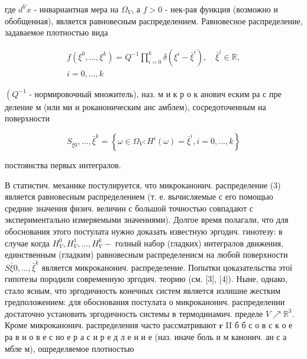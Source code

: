 \documentclass[10pt]{article}
\begin{document}
где $d^{V} x$ - инвариантная мера на $\Omega_{V}$, а $f>0$ - нек-рая функция (возможно и обобщенная), является равновесным распределением. Равновесное распределение, задаваемое плотностью вида



\[

\begin{gathered}

f\left(\xi^{0}, \ldots, \xi^{k}\right)=Q^{-1} \prod_{i=0}^{k} \delta\left(\xi^{i}-\bar{\xi}^{i}\right), \quad \bar{\xi}^{i} \in \mathbb{R}, \\

i=0, \ldots, k

\end{gathered}

\]



$\left(Q^{-1}\right.$ - нормировочный множитель), наз. м и к р о к анович еским ра с пре деление м (или ми и роканоническим анс амблем), сосредоточенным на поверхности



\[

S_{\bar{\xi} 0}, \ldots, \bar{\xi}^{k}=\left\{\omega \in \Omega_{V}: H^{i}(\omega)=\bar{\xi}^{i}, i=0, \ldots, k\right\}

\]



постоянства первых интегралов.



В статистич. механике постулируется, что микроканонич. распределение (3) является равновесным распределением (т. е. вычисляемые с его помощью средние значения физич. величин с большой точностью совпадают с экспериментально измеряемыми значениями). Долгое время полагали, что для обоснования этого постулата нужно доказать известную эргодич. гинотезу: в случае когда $H_{V}^{0}, H_{V}^{1}, \ldots, H_{V}^{k}-$ голный набор (гладких) интегралов движения, единственным (гладким) равновесным распределенисм на любой поверхности $S \bar{\xi} 0, \ldots, \bar{\xi}^{k}$ является микроканонич. распределение. Попытки цоказательства этої гипотезы породили современную зргодич. теорию (см. [3], [4]). Ныне, однако, стало ясным, что эргодичность конечных систем является излишне жестким гредположением: для обоснования постулата о микроканонич. распределении достаточно установить эргодичность системы в термодинамич. пределе $V \nearrow \mathbb{R}^{3}$. Кроме микроканонич. распределения часто рассматривают $\boldsymbol{r}$ II б б с о в с к о е ра в н о в е с но е р а с и р е д л е н и е (наз. иначе боль и м канонич. ан с а мбле м), ошределяемое плотностью
\end{document}
